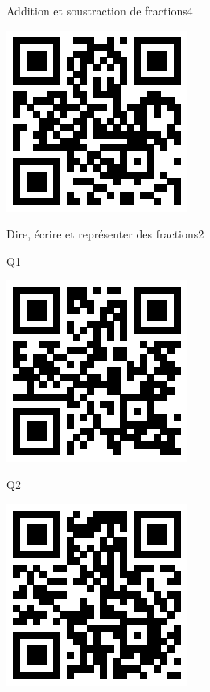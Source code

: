 \documentclass[a4paper,11pt]{report}
\begin{document}
\begin{qmoodle}{Addition et soustraction de fractions}{4}
{\begin{center}
		\includegraphics[scale=1]{img/no3fractions/asfq/asfq_4}
	\end{center}
}
\end{qmoodle}

\begin{qmoodle}{Dire, écrire et représenter des fractions}{2}{
	\begin{center}
		Q1

		\includegraphics[scale=1]{img/no3fractions/derfq/derfq_1}
	\end{center}
	\begin{center}
		Q2

		\includegraphics[scale=1]{img/no3fractions/derfq/derfq_2}
	\end{center}
}
\end{qmoodle}
\end{document}
